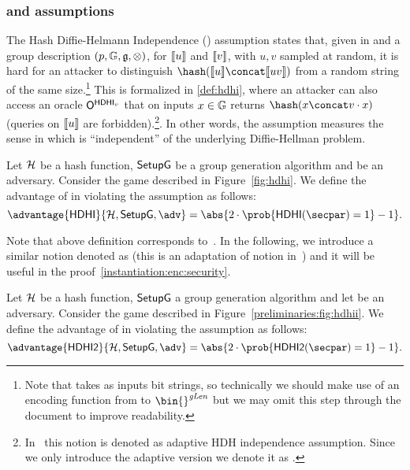 \subsubsection{\hdhi{} and \hdhii{} assumptions}

The Hash Diffie-Helmann Independence (\hdhi{}) assumption states that, given \hash{} in \hashSet{} and a group description $(p, \mathbb{G}, \mathfrak{g}, \otimes)$, for $\llbracket {u} \rrbracket$ and $\llbracket {v} \rrbracket$, with $u,v$ sampled at random, it is hard for an attacker to distinguish $\hash(\groupenc{u} \concat \groupenc{uv})$ from a random string of the same size.\footnote{Note that \hash{} takes as inputs bit strings, so technically we should make use of an encoding function from \gset to $\bin{}^{\groupLen}$ but we may omit this step through the document to improve readability.} This is formalized in \cref{def:hdhi}, where an attacker can also access an oracle $\mathsf{O}^{\mathsf{HDHI}_{v}}$ that on inputs $x \in \mathbb{G}$ returns $\hash(x \concat v\cdot x)$ (queries on $\llbracket {u} \rrbracket$ are forbidden).\footnote{In~\cite[Section 3.2.1]{abdalla1999dhaes} this notion is denoted as adaptive HDH independence assumption. Since we only introduce the adaptive version we denote it as \hdhi{}.}. In other words, the \hdhi{} assumption measures the sense in which \hash{} is ``independent'' of the underlying Diffie-Hellman problem.

\begin{definition}\label{def:hdhi}
    Let $\mathcal{H}$ be a hash function, $\mathsf{SetupG}$ be a group generation algorithm and \adv{} be an adversary. Consider the \hdhi{} game described in Figure~\ref{fig:hdhi}. We define the advantage of \adv{} in violating the \hdhi{} assumption as follows:
    \[
        \advantage{\hdhi}{\hashSet,\groupSetup, \adv} =  \abs{2\cdot\prob{\hdhi(\secpar) = 1} - 1}.
    \]

\end{definition}
Note that above definition corresponds to~\cite[Section 3.2.1, Definition 3]{abdalla1999dhaes}. In the following, we introduce a similar notion denoted as \hdhii{} (this is an adaptation of \odhii{} notion in~\cite[Section 6]{abdalla2010robust}) and it will be useful in the \ikcca{} proof~\cref{instantiation:enc:security}.

\begin{definition}[\hdhii]\label{preliminaries:definitions:hdhii}
    Let $\mathcal{H}$ be a hash function, $\mathsf{SetupG}$ a group generation algorithm and let \adv{} be an adversary. Consider the \hdhii{} game described in Figure~\ref{preliminaries:fig:hdhii}. We define the advantage of \adv{} in violating the \hdhii{} assumption as follows:
    \[
        \advantage{\hdhii}{\hashSet, \groupSetup, \adv} =  \abs{2 \cdot \prob{\hdhii(\secpar) = 1} - 1}.
    \]
\end{definition}

